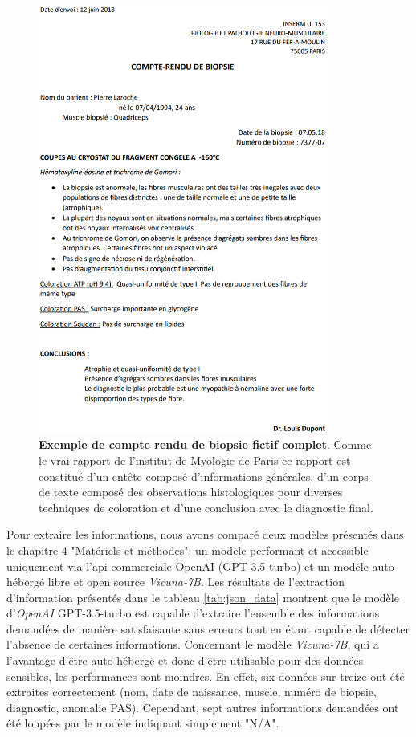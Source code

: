 \begin{figure}[htbp]
 \centering
 \includegraphics[width=0.85\textwidth]{figures/pdf_biopsie.png}
 \caption[Compte rendu de biopsie fictif]{\textbf{Exemple de compte rendu de biopsie fictif complet}. Comme le vrai rapport de l'institut de Myologie de Paris ce rapport est constitué d'un entête composé d'informations générales, d'un corps de texte composé des observations histologiques pour diverses techniques de coloration et d'une conclusion avec le diagnostic final.}
 \label{fig:factice_report}
\end{figure}

Pour extraire les informations, nous avons comparé deux modèles présentés dans le chapitre 4 "Matériels et méthodes": un modèle performant et accessible uniquement via l'\gls{api} commerciale OpenAI (GPT-3.5-turbo) et un modèle auto-hébergé libre et open source \textit{Vicuna-7B}. Les résultats de l'extraction d'information présentés dans le tableau \ref{tab:json_data} montrent que le modèle d'\textit{OpenAI} GPT-3.5-turbo est capable d'extraire l'ensemble des informations demandées de manière satisfaisante sans erreurs tout en étant capable de détecter l'absence de certaines informations. Concernant le modèle \textit{Vicuna-7B}, qui a l'avantage d'être auto-hébergé et donc d'être utilisable pour des données sensibles, les performances sont moindres. En effet, six données sur treize ont été extraites correctement (nom, date de naissance, muscle, numéro de biopsie, diagnostic, anomalie PAS). Cependant, sept autres informations demandées ont été loupées par le modèle indiquant simplement "N/A".

